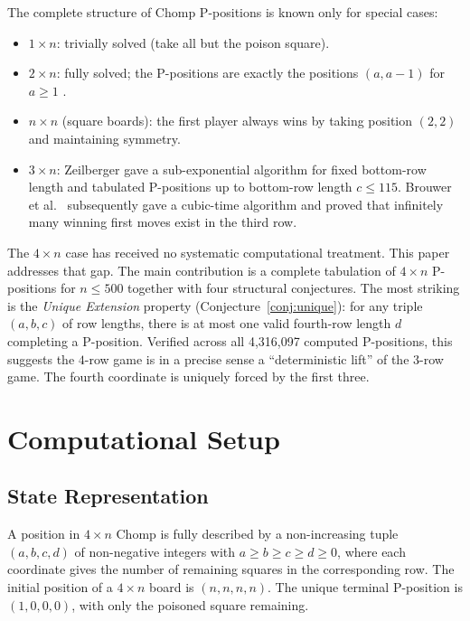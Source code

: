 \documentclass[12pt]{article}
\begin{document}
The complete structure of Chomp P-positions is known only for special
cases:
\begin{itemize}
  \item $1 \times n$: trivially solved (take all but the poison square).
  \item $2 \times n$: fully solved; the P-positions are exactly the
        positions $(a, a-1)$ for $a \geq 1$ \cite{berlekamp2001}.
  \item $n \times n$ (square boards): the first player always wins by
        taking position $(2,2)$ and maintaining symmetry.
  \item $3 \times n$: Zeilberger \cite{zeilberger2001} gave a
        sub-exponential algorithm for fixed bottom-row length and
        tabulated P-positions up to bottom-row length $c \leq 115$.
        Brouwer et al.\ \cite{brouwer2005} subsequently gave a
        cubic-time algorithm and proved that infinitely many winning
        first moves exist in the third row.
\end{itemize}

The $4 \times n$ case has received no systematic computational treatment.
This paper addresses that gap. The main contribution is a complete tabulation
of $4 \times n$ P-positions for $n \leq 500$ together with four structural
conjectures. The most striking is the \emph{Unique Extension} property
(Conjecture~\ref{conj:unique}): for any triple $(a, b, c)$ of row lengths,
there is at most one valid fourth-row length $d$ completing a P-position.
Verified across all 4,316,097 computed P-positions, this suggests the
$4$-row game is in a precise sense a ``deterministic lift'' of the $3$-row
game. The fourth coordinate is uniquely forced by the first three.

\section{Computational Setup}

\subsection{State Representation}

A position in $4 \times n$ Chomp is fully described by a non-increasing
tuple $(a, b, c, d)$ of non-negative integers with $a \geq b \geq c
\geq d \geq 0$, where each coordinate gives the number of remaining
squares in the corresponding row. The initial position of a $4 \times n$
board is $(n, n, n, n)$. The unique terminal P-position is
$(1, 0, 0, 0)$, with only the poisoned square remaining.
\end{document}
